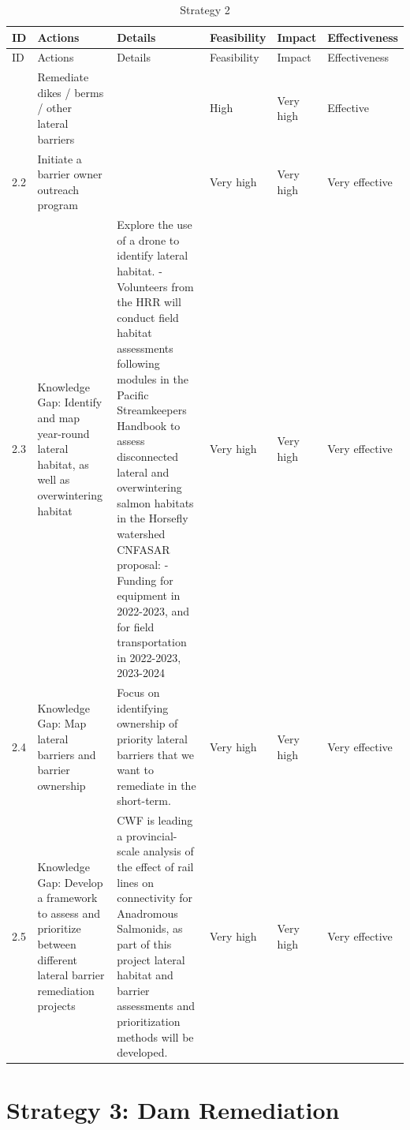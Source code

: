 \documentclass[
  letterpaper,
  DIV=11,
  numbers=noendperiod]{scrreprt}
\begin{document}
\hypertarget{tbl-S2}{}
\begin{longtable}[]{@{}llllll@{}}
\caption{\label{tbl-S2}Strategy 2}\label{T_7e97d_}\tabularnewline
\toprule\noalign{}
ID & Actions & Details & Feasibility & Impact & Effectiveness \\
\midrule\noalign{}
\endfirsthead
\toprule\noalign{}
ID & Actions & Details & Feasibility & Impact & Effectiveness \\
\midrule\noalign{}
\endhead
\bottomrule\noalign{}
\endlastfoot
2.1 & Remediate dikes / berms / other lateral barriers & & High & Very
high & Effective \\
2.2 & Initiate a barrier owner outreach program & & Very high & Very
high & Very effective \\
2.3 & Knowledge Gap: Identify and map year-round lateral habitat, as
well as overwintering habitat & Explore the use of a drone to identify
lateral habitat. - Volunteers from the HRR will conduct field habitat
assessments following modules in the Pacific Streamkeepers Handbook to
assess disconnected lateral and overwintering salmon habitats in the
Horsefly watershed CNFASAR proposal: -Funding for equipment in
2022-2023, and for field transportation in 2022-2023, 2023-2024 & Very
high & Very high & Very effective \\
2.4 & Knowledge Gap: Map lateral barriers and barrier ownership & Focus
on identifying ownership of priority lateral barriers that we want to
remediate in the short-term. & Very high & Very high & Very effective \\
2.5 & Knowledge Gap: Develop a framework to assess and prioritize
between different lateral barrier remediation projects & CWF is leading
a provincial-scale analysis of the effect of rail lines on connectivity
for Anadromous Salmonids, as part of this project lateral habitat and
barrier assessments and prioritization methods will be developed. & Very
high & Very high & Very effective \\
\end{longtable}

\hypertarget{strategy-3-dam-remediation}{%
\section*{Strategy 3: Dam
Remediation}\label{strategy-3-dam-remediation}}

\end{document}
